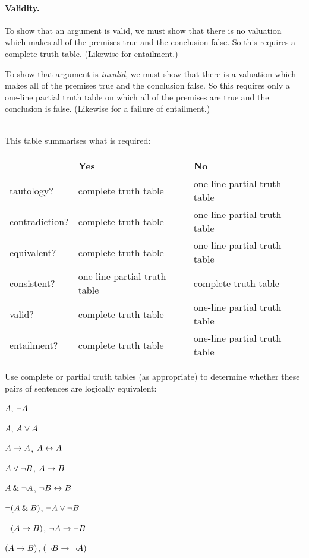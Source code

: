 \paragraph{Validity.}
To show that an argument is valid, we must show that there is no valuation which makes all of the premises true and the conclusion false. So this  requires a complete truth table.  (Likewise for entailment.)

To show that argument is \emph{invalid}, we must show that there is a valuation which makes all of the premises true and the conclusion false. So this requires only a one-line partial truth table on which all of the premises are true and the conclusion is false. (Likewise for a failure of entailment.)


\
\\This table summarises what is required:

\begin{center}
\begin{tabular}{l l l}
 & \textbf{Yes} & \textbf{No}\\
 \hline
tautology? & complete truth table & one-line partial truth table\\
contradiction? &  complete truth table  & one-line partial truth table\\
equivalent? & complete truth table & one-line partial truth table\\
consistent? & one-line partial truth table & complete truth table\\
valid? & complete truth table & one-line partial truth table\\
entailment? & complete truth table & one-line partial truth table\\
\end{tabular}
\end{center}
\label{table.CompleteVsPartial}


\practiceproblems
\solutions

\solutions
\problempart
\label{pr.TT.equiv3}
Use complete or partial truth tables (as appropriate) to determine whether these pairs of sentences are logically equivalent:
\begin{earg}
\item $A$, $\neg A$ %
\item $A$, $A \vee A$ %
\item $A\rightarrow A$, $A \leftrightarrow A$ %
\item $A \vee \neg B$, $A\rightarrow B$ %
\item $A \mathbin{\&} \neg A$, $\neg B \leftrightarrow B$ %
\item $\neg(A \mathbin{\&} B)$, $\neg A \vee \neg B$ %
\item $\neg(A \rightarrow B)$, $\neg A \rightarrow \neg B$ %
\item $(A \rightarrow B)$, $(\neg B \rightarrow \neg A)$ %
\end{earg}

